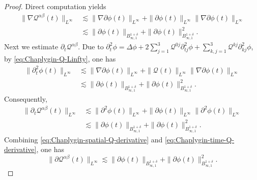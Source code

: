 \documentclass[10pt,a4paper]{amsart}
\def\cQ{\mathcal Q}
\def\ds{\displaystyle}
\def\ls{\lesssim}
\begin{document}
\begin{proof}
		Direct computation yields
		\begin{equation}\label{eq:Chaplygin-spatial-Q-derivative}
			\begin{aligned}
				\|\nabla\cQ^{\alpha\beta}(t)\|_{L^\infty}
				&\ls
				\|\nabla\partial\phi(t)\|_{L^\infty}
				+
				\|\partial\phi(t)\|_{L^\infty}
				\|\nabla\partial\phi(t)\|_{L^\infty}
				\\
				&\ls
				\|\partial\phi(t)\|_{B_{\infty,1}^{1+\delta}}
				+
				\|\partial\phi(t)\|_{B_{\infty,1}^{1+\delta}}^2.
			\end{aligned}
		\end{equation}
		Next we estimate $\partial_t\cQ^{\alpha\beta}$. Due to
		$\partial_t^2\phi
			=\Delta\phi	+2\ds\sum_{j=1}^3\cQ^{0j}\partial_{tj}^2\phi
			+\ds\sum_{k,j=1}^3\cQ^{kj}\partial_{kj}^2\phi$,
		by \eqref{eq:Chaplygin-Q-Linfty}, one has
		\begin{equation}\label{eq:Chaplygin-ttphi-Linfty}
			\begin{aligned}
				\|\partial_t^2\phi(t)\|_{L^\infty}
				&\ls
				\|\nabla\partial\phi(t)\|_{L^\infty}
				+
				\|\cQ(t)\|_{L^\infty}
				\|\nabla\partial\phi(t)\|_{L^\infty}
				\\
				&\ls
				\|\partial\phi(t)\|_{B_{\infty,1}^{1+\delta}}
				+
				\|\partial\phi(t)\|_{B_{\infty,1}^{1+\delta}}^2.
			\end{aligned}
		\end{equation}
		Consequently,
		\begin{equation}\label{eq:Chaplygin-time-Q-derivative}
			\begin{aligned}
				\|\partial_t\cQ^{\alpha\beta}(t)\|_{L^\infty}
				&\ls
				\|\partial^2\phi(t)\|_{L^\infty}
				+\|\partial\phi(t)\|_{L^\infty}
				\|\partial^2\phi(t)\|_{L^\infty}\\
				&\ls\|\partial\phi(t)\|_{B_{\infty,1}^{1+\delta}}
				+\|\partial\phi(t)\|_{B_{\infty,1}^{1+\delta}}^2.
			\end{aligned}
		\end{equation}
		Combining
		\eqref{eq:Chaplygin-spatial-Q-derivative} and
		\eqref{eq:Chaplygin-time-Q-derivative}, one has
		\begin{equation}\label{eq:Chaplygin-full-Q-derivative}
			\|\partial\cQ^{\alpha\beta}(t)\|_{L^\infty}
			\ls
			\|\partial\phi(t)\|_{B_{\infty,1}^{1+\delta}}
			+
			\|\partial\phi(t)\|_{B_{\infty,1}^{1+\delta}}^2.
		\end{equation}
		

\end{proof}
\end{document}
